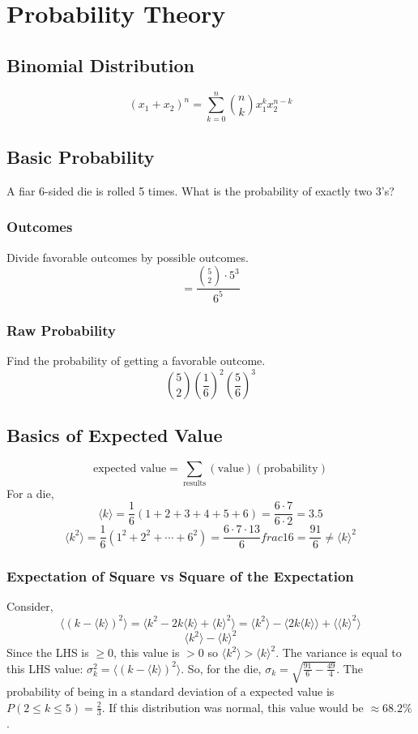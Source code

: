 \documentclass[../main.tex]{subfiles}
\begin{document}
\chapter{Probability Theory}
\section{Binomial Distribution}
$$(x_{1}+x_{2})^{n}=\sum_{k=0}^{n}{n \choose k}x_{1}^{k}x_{2}^{n-k}$$
\section{Basic Probability}
A fiar 6-sided die is rolled 5 times. What is the probability of exactly two 3's?
\subsection{Outcomes}
Divide favorable outcomes by possible outcomes.
$$=\frac{{5 \choose 2}\cdot 5^{3}}{6^{5}}$$
\subsection{Raw Probability}
Find the probability of getting a favorable outcome.
$${5\choose 2}\left(\frac{1}{6}\right)^{2}\left(\frac{5}{6}\right)^{3}$$

\section{Basics of Expected Value}
$$\text{expected value}=\sum_{\text{results}}(\text{value})(\text{probability})$$
For a die,
$$\langle k\rangle=\frac{1}{6}(1+2+3+4+5+6)=\frac{6\cdot 7}{6\cdot 2}=3.5$$
$$\langle k^{2}\rangle=\frac{1}{6}(1^{2}+2^{2}+\cdots+6^{2})=\frac{6\cdot 7\cdot 13}{6}frac{1}{6}=\frac{91}{6}\neq \langle k\rangle^{2}$$
\subsection{Expectation of Square vs Square of the Expectation}
Consider,
$$\langle (k-\langle k \rangle)^{2}\rangle = \langle k^{2}-2k\langle k \rangle+\langle k \rangle^{2}\rangle=\langle k^{2}\rangle-\langle 2k\langle k\rangle\rangle+\langle \langle k\rangle^{2}\rangle$$
$$\langle k^{2} \rangle-\langle k\rangle^{2}$$
Since the LHS is $\geq 0$, this value is $>0$ so $\langle k^{2} \rangle > \langle k\rangle^{2}$.
The variance is equal to this LHS value: $\sigma_{k}^{2}=\langle (k-\langle k \rangle)^{2}\rangle$.
So, for the die, $\sigma_{k}=\sqrt{\frac{91}{6}-\frac{49}{4}}$. The probability of being in a standard deviation of a expected value is
$P(2\leq k\leq 5)=\frac{2}{3}$. If this distribution was normal, this value would be $\approx 68.2\%$.
\end{document}
